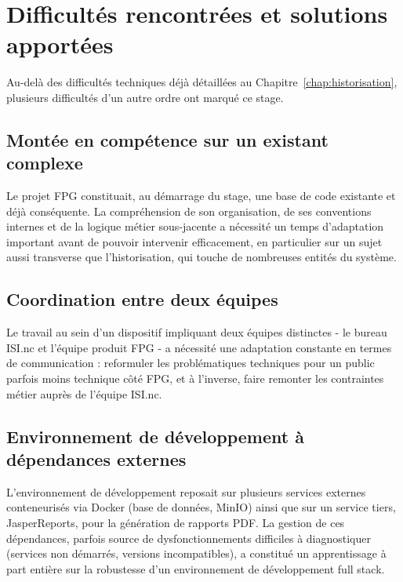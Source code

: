 
\chapter{Difficultés rencontrées et solutions apportées}

Au-delà des difficultés techniques déjà détaillées au
Chapitre~\ref{chap:historisation}, plusieurs difficultés d'un autre ordre
ont marqué ce stage.

\section{Montée en compétence sur un existant complexe}

Le projet FPG constituait, au démarrage du stage, une base de code
existante et déjà conséquente. La compréhension de son organisation, de
ses conventions internes et de la logique métier sous-jacente a
nécessité un temps d'adaptation important avant de pouvoir intervenir
efficacement, en particulier sur un sujet aussi transverse que
l'historisation, qui touche de nombreuses entités du système.

\section{Coordination entre deux équipes}

Le travail au sein d'un dispositif impliquant deux équipes distinctes  - 
le bureau ISI.nc et l'équipe produit FPG  -  a nécessité une adaptation
constante en termes de communication : reformuler les problématiques
techniques pour un public parfois moins technique côté FPG, et à
l'inverse, faire remonter les contraintes métier auprès de l'équipe
ISI.nc.

\section{Environnement de développement à dépendances externes}

L'environnement de développement reposait sur plusieurs services
externes conteneurisés via Docker (base de données, MinIO) ainsi que sur
un service tiers, JasperReports, pour la génération de rapports PDF. La
gestion de ces dépendances, parfois source de dysfonctionnements
difficiles à diagnostiquer (services non démarrés, versions
incompatibles), a constitué un apprentissage à part entière sur la
robustesse d'un environnement de développement full stack.
